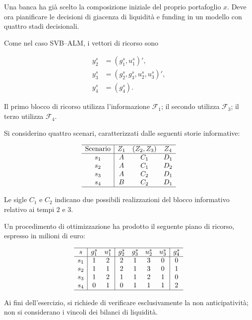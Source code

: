 \begin{exercise}

\label{ex:cap15-nonanticipativita-finanziaria}

Una banca ha gi\`a scelto la composizione
iniziale del proprio portafoglio $x$.
Deve ora pianificare le decisioni
di giacenza di liquidit\`a e funding
in un modello con quattro stadi decisionali.

Come nel caso SVB--ALM, i vettori
di ricorso sono

\[
\begin{aligned}
y_2^s
&=
(g_1^s,u_1^s)',
\\[4pt]
y_3^s
&=
(g_2^s,g_3^s,u_2^s,u_3^s)',
\\[4pt]
y_4^s
&=
(g_4^s).
\end{aligned}
\]

Il primo blocco di ricorso
utilizza l'informazione $\mathcal F_1$;
il secondo utilizza $\mathcal F_3$;
il terzo utilizza $\mathcal F_4$.

Si considerino quattro scenari,
caratterizzati dalle seguenti
storie informative:

\[
\begin{array}{c|ccc}
\hline
\text{Scenario}
&
Z_1
&
(Z_2,Z_3)
&
Z_4\\
\hline
s_1&A&C_1&D_1\\
s_2&A&C_1&D_2\\
s_3&A&C_2&D_1\\
s_4&B&C_2&D_1\\
\hline
\end{array}
\]

Le sigle $C_1$ e $C_2$ indicano
due possibili realizzazioni del blocco
informativo relativo ai tempi $2$ e $3$.

Un procedimento di ottimizzazione
ha prodotto il seguente piano
di ricorso, espresso in milioni di euro:

\[
\begin{array}{c|cc|cccc|c}
\hline
s
&
g_1^s&u_1^s
&
g_2^s&g_3^s&u_2^s&u_3^s
&
g_4^s\\
\hline
s_1&1&2&2&1&3&0&0\\
s_2&1&1&2&1&3&0&1\\
s_3&1&2&1&1&2&1&0\\
s_4&0&1&0&1&1&1&2\\
\hline
\end{array}
\]

Ai fini dell'esercizio, si richiede
di verificare esclusivamente
la non anticipativit\`a;
non si considerano i vincoli
dei bilanci di liquidit\`a.


\end{exercise}
